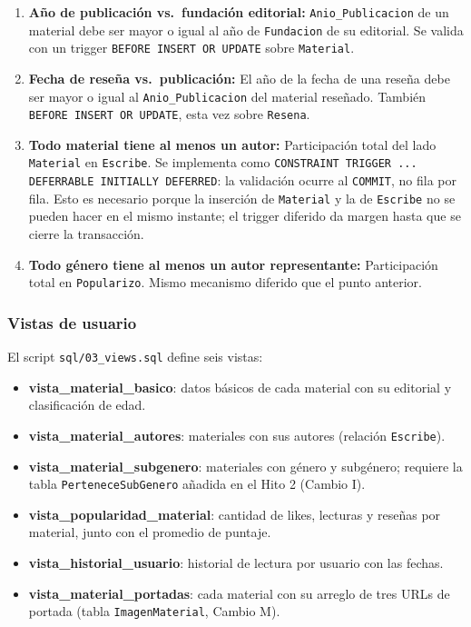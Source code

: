 \documentclass[12pt,a4paper]{article}
\begin{document}
\begin{enumerate}[label=(\alph*)]
  \item \textbf{Año de publicación vs.\ fundación editorial:}
  \texttt{Anio\_Publicacion} de un material debe ser mayor o igual al año de
  \texttt{Fundacion} de su editorial. Se valida con un trigger
  \texttt{BEFORE INSERT OR UPDATE} sobre \texttt{Material}.

  \item \textbf{Fecha de reseña vs.\ publicación:}
  El año de la fecha de una reseña debe ser mayor o igual al
  \texttt{Anio\_Publicacion} del material reseñado. También
  \texttt{BEFORE INSERT OR UPDATE}, esta vez sobre \texttt{Resena}.

  \item \textbf{Todo material tiene al menos un autor:}
  Participación total del lado \texttt{Material} en \texttt{Escribe}.
  Se implementa como \texttt{CONSTRAINT TRIGGER ... DEFERRABLE INITIALLY
  DEFERRED}: la validación ocurre al \texttt{COMMIT}, no fila por fila.
  Esto es necesario porque la inserción de \texttt{Material} y la de
  \texttt{Escribe} no se pueden hacer en el mismo instante; el trigger
  diferido da margen hasta que se cierre la transacción.

  \item \textbf{Todo género tiene al menos un autor representante:}
  Participación total en \texttt{Popularizo}. Mismo mecanismo diferido
  que el punto anterior.
\end{enumerate}


\subsubsection{Vistas de usuario}

El script \texttt{sql/03\_views.sql} define seis vistas:


\begin{itemize}
  \item \textbf{vista\_material\_basico}: datos básicos de cada material
  con su editorial y clasificación de edad.
  \item \textbf{vista\_material\_autores}: materiales con sus autores
  (relación \texttt{Escribe}).
  \item \textbf{vista\_material\_subgenero}: materiales con género y
  subgénero; requiere la tabla \texttt{PerteneceSubGenero} añadida en
  el Hito 2 (Cambio I).
  \item \textbf{vista\_popularidad\_material}: cantidad de likes, lecturas
  y reseñas por material, junto con el promedio de puntaje.
  \item \textbf{vista\_historial\_usuario}: historial de lectura por usuario
  con las fechas.
  \item \textbf{vista\_material\_portadas}: cada material con su arreglo de
  tres URLs de portada (tabla \texttt{ImagenMaterial}, Cambio M).
\end{itemize}
\end{document}

